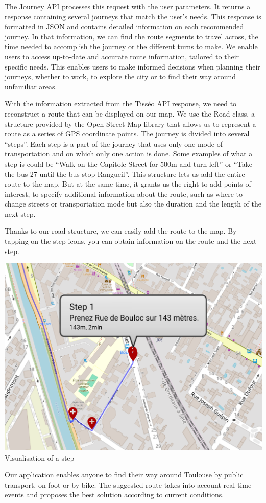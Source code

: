 The Journey API processes this request with the user parameters. It returns a response containing several journeys that match the user's needs. This response is formatted in JSON and contains detailed information on each recommended journey. In that information, we can find the route segments to travel across, the time needed to accomplish the journey or the different turns to make. We enable users to access up-to-date and accurate route information, tailored to their specific needs. This enables users to make informed decisions when planning their journeys, whether to work, to explore the city or to find their way around unfamiliar areas.\newline

With the information extracted from the Tisséo API response, we need to reconstruct a route that can be displayed on our map. We use the Road class, a structure provided by the Open Street Map library that allows us to represent a route as a series of GPS coordinate points. The journey is divided into several “steps”. Each step is a part of the journey that uses only one mode of transportation and on which only one action is done. Some examples of what a step is could be “Walk on the Capitole Street for 500m and turn left” or “Take the bus 27 until the bus stop Rangueil”. This structure lets us add the entire route to the map. But at the same time, it grants us the right to add points of interest, to specify additional information about the route, such as where to change streets or transportation mode but also the duration and the length of the next step.\newline

Thanks to our road structure, we can easily add the route to the map. By tapping on the step icons, you can obtain information on the route and the next step.\newline

\begin{center}
\includegraphics[scale=0.30]{content/step_cut.png} 
\newline
Visualisation of a step
\newline
\end{center}

Our application enables anyone to find their way around Toulouse by public transport, on foot or by bike. The suggested route takes into account real-time events and proposes the best solution according to current conditions.\newline
